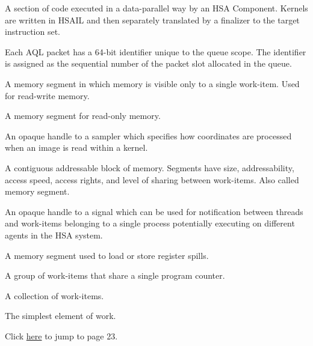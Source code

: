 \documentclass[final]{book}
\begin{document}
\begin{description}[itemsep=5pt,leftmargin=0cm, labelindent=0cm]
\item[Kernel] A section of code executed in a data-parallel way by an HSA
  Component. Kernels are written in HSAIL and then separately translated by a
  finalizer to the target instruction set.

\item[Packet ID] Each AQL packet has a 64-bit identifier unique to the queue
  scope. The identifier is assigned as the sequential number of the packet slot
  allocated in the queue.

\item[Private segment] A memory segment in which memory is visible only to a
  single work-item. Used for read-write memory.

\item[Readonly segment] A memory segment for read-only memory.

\item[Sampler handle] An opaque handle to a sampler which specifies how
  coordinates are processed when an image is read within a kernel.

\item[Segment] A contiguous addressable block of memory. Segments have size,
  addressability, access speed, access rights, and level of sharing between
  work-items. Also called memory segment.

\item[Signal (handle)] An opaque handle to a signal which can be used for
  notification between threads and work-items belonging to a single process
  potentially executing on different agents in the HSA system.

\item[Spill segment] A memory segment used to load or store register spills.

\item[Wavefront] A group of work-items that share a single program counter.

\item[Work-group] A collection of work-items.

\item[Work-item] The simplest element of work.

\end{description}

\newpage
{}
Click \hyperlink{page.23}{here} to jump to page 23.
\printindex[api]
\printindex[ext]
\end{document}
